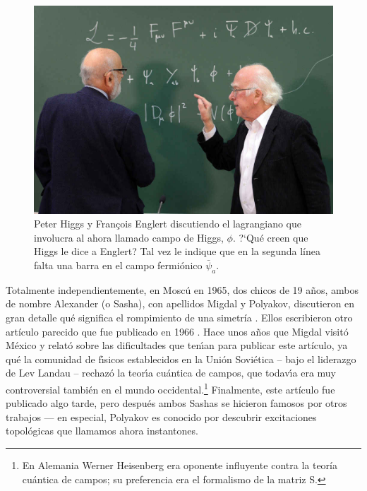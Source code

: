 \begin{figure}[h]
\centering
\includegraphics[scale=0.3]{images/higgs_englert_pizarra.jpeg}
\caption{Peter Higgs y Fran\c{c}ois Englert discutiendo el lagrangiano
que involucra al ahora llamado campo de Higgs, $\phi$.
?`Qu\'e creen que Higgs le dice a Englert? Tal vez le indique que
en la segunda l\'inea falta una barra en el campo fermi\'onico
$\bar \psi_a$.}
\end{figure}


Totalmente independientemente, en Mosc\'{u} en 1965, dos chicos de 19
a\~nos, ambos de nombre Alexander (o Sasha), con apellidos Migdal y
Polyakov, discutieron en gran detalle qu\'e significa el rompimiento
de una simetr\'ia \cite{Nobel13}. Ellos escribieron otro art\'iculo
parecido que fue publicado en 1966 \cite{MigPol}. Hace unos
a\~{n}os que Migdal visit\'o M\'exico y
relat\'o sobre las dificultades que ten\'{\i}an para publicar
este art\'iculo, ya qu\'e la comunidad de f\'{\i}sicos establecidos
en la Uni\'on Sovi\'etica -- bajo el liderazgo de Lev Landau -- rechaz\'o
la teor\'{\i}a cu\'antica de campos, que todav\'{\i}a era muy
controversial tambi\'en en el mundo occidental.\footnote{En Alemania
Werner Heisenberg era oponente influyente contra la teor\'ia cu\'antica
de campos; su preferencia era el formalismo de la matriz S.}
Finalmente, este art\'iculo
fue publicado algo tarde, pero despu\'es ambos Sashas se hicieron
famosos por otros trabajos --- en especial, Polyakov es conocido por
descubrir excitaciones topol\'ogicas que llamamos ahora instantones.

